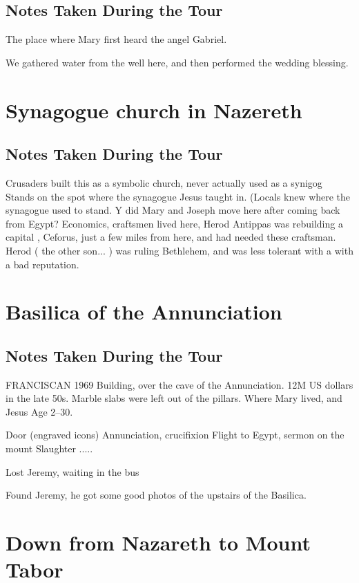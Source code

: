 \documentclass[letterpaper]{report}
\begin{document}
\subsection{Notes Taken During the Tour}
The place where Mary first heard the angel Gabriel.

We gathered water from the well here,
and then performed the wedding blessing.

\clearpage
\section{Synagogue church in Nazereth}
\begin{multicols}{2}
	\mbox{}
\end{multicols}
\subsection{Notes Taken During the Tour}
Crusaders built this as a symbolic church, never actually used as a synigog
Stands on the spot where the synagogue Jesus taught in. (Locals knew where the synagogue used to stand.
Y did Mary and Joseph move here after coming back from Egypt? Economics, craftsmen lived here, Herod Antippas was rebuilding a capital , Ceforus, just a few miles from here, and had needed these craftsman. Herod ( the other son... ) was ruling Bethlehem, and was less tolerant with a with a bad reputation.

\clearpage
\section{Basilica of the Annunciation}
\begin{multicols}{2}
	\mbox{}
\end{multicols}
\subsection{Notes Taken During the Tour}
FRANCISCAN
1969 Building, over the cave of the Annunciation.
12M US dollars in the late 50s. Marble slabs were left out of the pillars.
Where Mary lived, and Jesus Age 2--30.

Door (engraved icons)
Annunciation, crucifixion
Flight to Egypt, sermon on the mount
Slaughter .....

Lost Jeremy, waiting in the bus

Found Jeremy, he got some good photos of the upstairs of the Basilica.

\clearpage
\section{Down from Nazareth to Mount Tabor}
\begin{multicols}{2}
  \mbox{}
\end{multicols}
\end{document}
